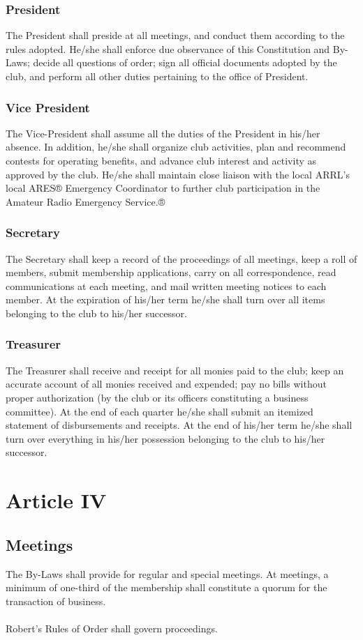\documentclass[english,12pt,letterpaper]{article}
\begin{document}
	\subsubsection*{President}
	The President shall preside at all meetings, and conduct them according to the rules adopted. He/she shall enforce due observance of this Constitution and By-Laws; decide all questions of order; sign all official documents adopted by the club, and perform all other duties pertaining to the office of President.
	\subsubsection*{Vice President}
	The Vice-President shall assume all the duties of the President in his/her absence. In addition, he/she shall organize club activities, plan and recommend contests for operating benefits, and advance club interest and activity as approved by the club. He/she shall maintain close liaison with the local ARRL's local ARES® Emergency Coordinator to further club participation in the Amateur Radio Emergency Service.®
	\subsubsection*{Secretary}
	The Secretary shall keep a record of the proceedings of all meetings, keep a roll of members, submit membership applications, carry on all correspondence, read communications at each meeting, and mail written meeting notices to each member. At the expiration of his/her term he/she shall turn over all items belonging to the club to his/her successor.
	\subsubsection*{Treasurer}
	The Treasurer shall receive and receipt for all monies paid to the club; keep an accurate account of	all monies received and expended; pay no bills without proper authorization (by the club or its officers constituting a business committee). At the end of each quarter he/she shall submit an itemized statement of disbursements and receipts. At the end of his/her term he/she shall turn over everything in his/her possession belonging to the club to his/her successor.
	\section*{Article IV}
	\subsection*{Meetings}
	The By-Laws shall provide for regular and special meetings. At meetings, a minimum of one-third of the membership shall constitute a quorum for the transaction of business. \\
	\\
	Robert's Rules of Order shall govern proceedings.
\end{document}
